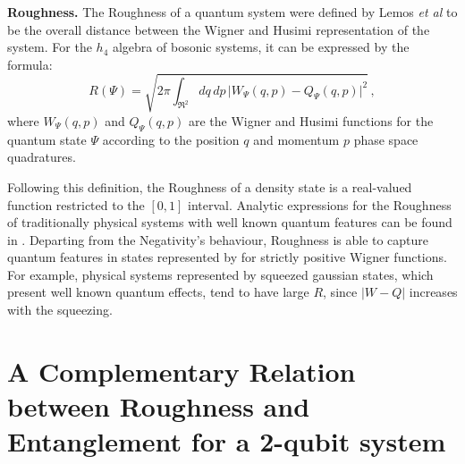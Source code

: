 \documentclass[aps,prl,preprint]{revtex4-1}
\begin{document}
	\textbf{Roughness.} The Roughness of a quantum system were defined by Lemos {\em et al}
	to be the overall distance between the Wigner and Husimi representation
	of the system. For the $h_4$ algebra of bosonic systems, 
	it can be expressed by the formula:
	\begin{equation} 
	\label{eq:R}
	R(\Psi) = \sqrt{ 2\pi \int_{\Re^2} \!\!\!\! dq \, dp\, \big|
		W_{\Psi} (q,p) - Q_{\Psi} (q,p) \big| ^{2} } \, ,
	\end{equation}
	where $W_{\Psi} (q,p)$ and $Q_{\Psi} (q,p)$ are the Wigner
	and Husimi functions for the quantum state $\Psi$ according to the 
	position $q$ and momentum $p$ phase space quadratures.
	
	
	Following this definition, the Roughness of a density state
	is a real-valued function restricted to the $[0, 1]$ interval.
	Analytic expressions for the Roughness of traditionally physical
	systems with well known quantum features can be found in
	\cite{Lemos2018}.
	Departing from the Negativity's behaviour, Roughness is able to capture
	quantum features in states represented by for strictly positive
	Wigner functions. For example, physical systems represented
	by squeezed gaussian states, which present well known quantum effects,
	tend to have large $R$, since $|W-Q|$ increases with the squeezing.
	
	
	\section{A Complementary Relation between Roughness and Entanglement for a 2-qubit system}
	
\end{document}
